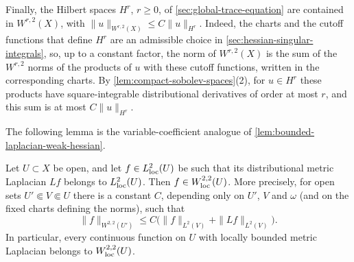 Finally, the Hilbert spaces $H^r$, $r\geq0$, of \cref{sec:global-trace-equation} are contained in $W^{r,2}(X)$, with $\|u\|_{W^{r,2}(X)}\leq C\|u\|_{H^r}$. Indeed, the charts and the cutoff functions that define $H^r$ are an admissible choice in \cref{sec:hessian-singular-integrals}, so, up to a constant factor, the norm of $W^{r,2}(X)$ is the sum of the $W^{r,2}$ norms of the products of $u$ with these cutoff functions, written in the corresponding charts. By \cref{lem:compact-sobolev-spaces}(2), for $u\in H^r$ these products have square-integrable distributional derivatives of order at most $r$, and this sum is at most $C\|u\|_{H^r}$.

The following lemma is the variable-coefficient analogue of \cref{lem:bounded-laplacian-weak-hessian}.

\begin{lemma}\label{lem:metric-laplacian-local-weak-hessian}
Let $U\subset X$ be open, and let $f\in L^2_{\mathrm{loc}}(U)$ be such that its distributional metric Laplacian $Lf$ belongs to $L^2_{\mathrm{loc}}(U)$. Then $f\in W^{2,2}_{\mathrm{loc}}(U)$. More precisely, for open sets $U'\Subset V\Subset U$ there is a constant $C$, depending only on $U'$, $V$ and $\omega$ (and on the fixed charts defining the norms), such that
\[
 \|f\|_{W^{2,2}(U')}\leq C\bigl(\|f\|_{L^2(V)}+\|Lf\|_{L^2(V)}\bigr).
\]
In particular, every continuous function on $U$ with locally bounded metric Laplacian belongs to $W^{2,2}_{\mathrm{loc}}(U)$.
\end{lemma}
